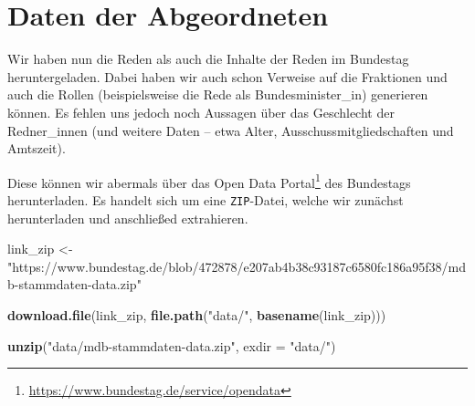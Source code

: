 \documentclass[oneside, 12pt, numbers=endperiod]{scrbook}
\newenvironment{Shaded}{\begin{snugshade}}{\end{snugshade}}
\newcommand{\DataTypeTok}[1]{\textcolor[rgb]{0.13,0.29,0.53}{#1}}
\newcommand{\KeywordTok}[1]{\textcolor[rgb]{0.13,0.29,0.53}{\textbf{#1}}}
\newcommand{\NormalTok}[1]{#1}
\newcommand{\OperatorTok}[1]{\textcolor[rgb]{0.81,0.36,0.00}{\textbf{#1}}}
\newcommand{\StringTok}[1]{\textcolor[rgb]{0.31,0.60,0.02}{#1}}
\theoremstyle{definition}
\theoremstyle{definition}
\theoremstyle{definition}
\theoremstyle{remark}
\begin{document}
\begin{Shaded}
\end{Shaded}

\hypertarget{daten-der-abgeordneten}{%
\chapter{Daten der Abgeordneten}\label{daten-der-abgeordneten}}

Wir haben nun die Reden als auch die Inhalte der Reden im Bundestag
heruntergeladen. Dabei haben wir auch schon Verweise auf die Fraktionen
und auch die Rollen (beispielsweise die Rede als Bundesminister\_in)
generieren können. Es fehlen uns jedoch noch Aussagen über das
Geschlecht der Redner\_innen (und weitere Daten -- etwa Alter,
Ausschussmitgliedschaften und Amtszeit).

Diese können wir abermals über das Open Data Portal\footnote{\url{https://www.bundestag.de/service/opendata}}
des Bundestags herunterladen. Es handelt sich um eine
\texttt{ZIP}-Datei, welche wir zunächst herunterladen und anschließed
extrahieren.

\begin{Shaded}
\begin{Highlighting}[]
\NormalTok{link_zip <-}\StringTok{ "https://www.bundestag.de/blob/472878/e207ab4b38c93187c6580fc186a95f38/mdb-stammdaten-data.zip"}

\KeywordTok{download.file}\NormalTok{(link_zip, }\KeywordTok{file.path}\NormalTok{(}\StringTok{"data/"}\NormalTok{, }\KeywordTok{basename}\NormalTok{(link_zip)))}

\KeywordTok{unzip}\NormalTok{(}\StringTok{"data/mdb-stammdaten-data.zip"}\NormalTok{, }\DataTypeTok{exdir =} \StringTok{"data/"}\NormalTok{)}
\end{Highlighting}
\end{Shaded}
\end{document}
